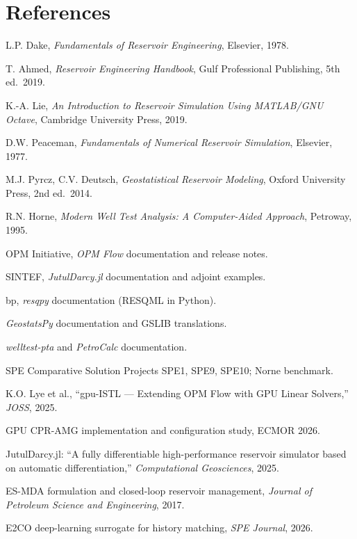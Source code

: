 \documentclass[10pt,a4paper]{article}
\begin{document}
\section*{References}
\begin{enumerate}[leftmargin=1.6em,label={[\arabic*]}]
  \item L.P. Dake, \emph{Fundamentals of Reservoir Engineering}, Elsevier, 1978.
  \item T. Ahmed, \emph{Reservoir Engineering Handbook}, Gulf Professional Publishing, 5th ed.\ 2019.
  \item K.-A. Lie, \emph{An Introduction to Reservoir Simulation Using MATLAB/GNU Octave}, Cambridge University Press, 2019.
  \item D.W. Peaceman, \emph{Fundamentals of Numerical Reservoir Simulation}, Elsevier, 1977.
  \item M.J. Pyrcz, C.V. Deutsch, \emph{Geostatistical Reservoir Modeling}, Oxford University Press, 2nd ed.\ 2014.
  \item R.N. Horne, \emph{Modern Well Test Analysis: A Computer-Aided Approach}, Petroway, 1995.
  \item OPM Initiative, \emph{OPM Flow} documentation and release notes.
  \item SINTEF, \emph{JutulDarcy.jl} documentation and adjoint examples.
  \item bp, \emph{resqpy} documentation (RESQML in Python).
  \item \emph{GeostatsPy} documentation and GSLIB translations.
  \item \emph{welltest-pta} and \emph{PetroCalc} documentation.
  \item SPE Comparative Solution Projects SPE1, SPE9, SPE10; Norne benchmark.
  \item K.O. Lye et al., ``gpu-ISTL --- Extending OPM Flow with GPU Linear Solvers,'' \emph{JOSS}, 2025.
  \item GPU CPR-AMG implementation and configuration study, ECMOR 2026.
  \item JutulDarcy.jl: ``A fully differentiable high-performance reservoir simulator based on automatic differentiation,'' \emph{Computational Geosciences}, 2025.
  \item ES-MDA formulation and closed-loop reservoir management, \emph{Journal of Petroleum Science and Engineering}, 2017.
  \item E2CO deep-learning surrogate for history matching, \emph{SPE Journal}, 2026.
\end{enumerate}
\end{document}
